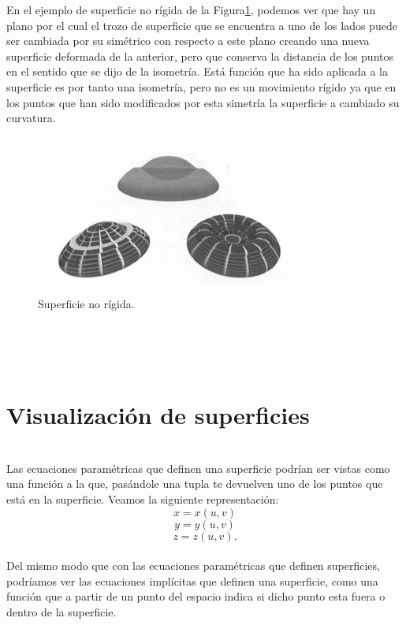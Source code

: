 En el ejemplo de superficie no rígida de la Figura\ref{fig:etiq_2}, podemos ver que hay un plano por el cual el trozo de superficie que se encuentra a uno de los lados puede ser cambiada por su simétrico con respecto a este plano creando una nueva superficie deformada de la anterior, pero que conserva la distancia de los puntos en el sentido que se dijo de la isometría. Está función que ha sido aplicada a la superficie es por tanto una isometría, pero no es un movimiento rígido ya que en los puntos que han sido modificados por esta simetría la superficie a cambiado su curvatura.
${ }$\\


\begin{figure}[h]
	\begin{center}
		\includegraphics[width=0.8\textwidth]{imagenes/no_rigid}
	\end{center}
	\caption{Superficie no rígida.}
	\label{fig:etiq_2}
\end{figure}



${ }$\\
${ }$\\
${ }$\\
\section{Visualización de superficies}
${ }$\\

Las ecuaciones paramétricas que definen una superficie podrían ser vistas como una función a la que, pasándole una tupla te devuelven uno de los puntos que está en la superficie. Veamos la siguiente representación:
${ }$\\
$$ x = x(u,v) $$
$$ y = y(u,v) $$
$$ z = z(u,v). $$
${ }$\\
Del mismo modo que con las ecuaciones paramétricas que definen superficies, podríamos ver las ecuaciones implícitas que definen una superficie, como una función que a partir de un punto del espacio indica si dicho punto esta fuera o dentro de la superficie.
${ }$\\


